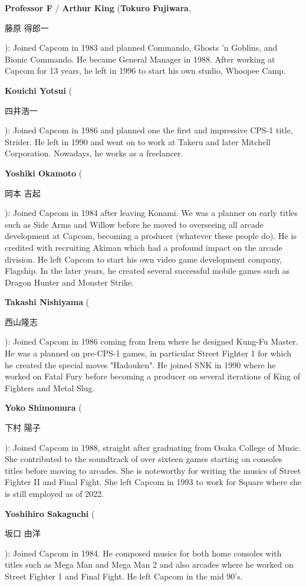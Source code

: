 \textbf{Professor F} / \textbf{Arthur King} (\textbf{Tokuro Fujiwara}, \begin{CJK}{UTF8}{min}藤原 得郎一\end{CJK}): Joined Capcom in 1983 and planned Commando, Ghosts 'n Goblins, and Bionic Commando. He became General Manager in 1988. After working at Capcom for 13 years, he left in 1996 to start his own studio, Whoopee Camp.

\textbf{Kouichi Yotsui} (\begin{CJK}{UTF8}{min}四井浩一\end{CJK}): Joined Capcom in 1986 and planned one the first and impressive CPS-1 title, Strider. He left in 1990 and went on to work at Takeru and later Mitchell Corporation. Nowadays, he works as a freelancer.

\textbf{Yoshiki Okamoto} (\begin{CJK}{UTF8}{min}岡本 吉起\end{CJK}): Joined Capcom in 1984 after leaving Konami. We was a planner on early titles such as Side Arms and Willow before he moved to overseeing all arcade development at Capcom, becoming a producer (whatever these people do). He is credited with recruiting Akiman which had a profound impact on the arcade division. He left Capcom to start his own video game development company, Flagship. In the later years, he created several successful mobile games such as Dragon Hunter and Monster Strike.   

\textbf{Takashi Nishiyama} (\begin{CJK}{UTF8}{min}西山隆志\end{CJK}): Joined Capcom in 1986 coming from Irem where he designed Kung-Fu Master. He was a planned on pre-CPS-1 games, in particular Street Fighter 1 for which he created the special moves "Hadouken". He joined SNK in 1990 where he worked on Fatal Fury before becoming a producer on several iterations of King of Fighters and Metal Slug.


\textbf{Yoko Shimomura} (\begin{CJK}{UTF8}{min}下村 陽子\end{CJK}): Joined Capcom in 1988, straight after graduating from Osaka College of Music. She contributed to the soundtrack of over sixteen games starting on consoles titles before moving to arcades. She is noteworthy for writing the musics of Street Fighter II and Final Fight. She left Capcom in 1993 to work for Square where she is still employed as of 2022.

\textbf{Yoshihiro Sakaguchi} (\begin{CJK}{UTF8}{min}坂口 由洋\end{CJK}): Joined Capcom in 1984. He composed musics for both home consoles with titles such as Mega Man and Mega Man 2 and also arcades where he worked on Street Fighter 1 and Final Fight. He left Capcom in the mid 90's.
